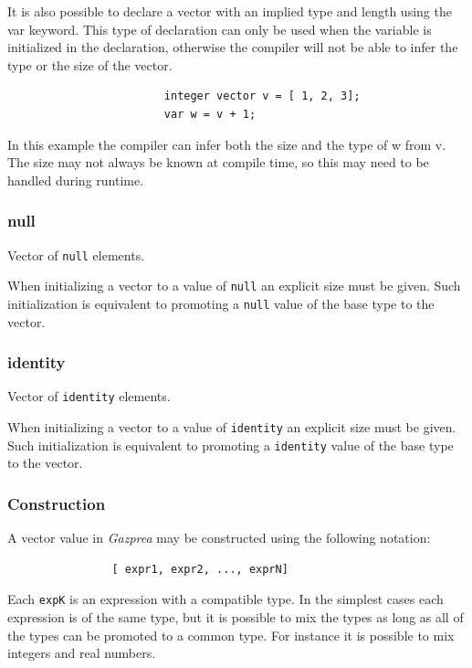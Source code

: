 \documentclass{article}
\begin{document}
\begin{enumerate}
					It is also possible to declare a vector with an implied type and length using the var keyword. This
					type of declaration can only be used when the variable is initialized in the declaration, otherwise
					the compiler will not be able to infer the type or the size of the vector.

					\begin{lstlisting}
						integer vector v = [ 1, 2, 3];
						var w = v + 1;
					\end{lstlisting}
					In this example the compiler can infer both the size and the type of w from v. The size may not
					always be known at compile time, so this may need to be handled during runtime.

			\end{enumerate}

		\subsubsection{null}

			Vector of \texttt{null} elements.

			When initializing a vector to a value of \texttt{null} an explicit size must be given. Such initialization
			is equivalent to promoting a \texttt{null} value of the base type to the vector.

		\subsubsection{identity}

			Vector of \texttt{identity} elements.

			When initializing a vector to a value of \texttt{identity} an explicit size must be given. Such
			initialization is equivalent to promoting a \texttt{identity} value of the base type to the vector.

		\subsubsection{Construction}

			A vector value in \textit{Gazprea} may be constructed using the following notation:

			\begin{lstlisting}
				[ expr1, expr2, ..., exprN]
			\end{lstlisting}

			Each \texttt{expK} is an expression with a compatible type. In the simplest cases each expression is of the
			same type, but it is possible to mix the types as long as all of the types can be promoted to a common type.
			For instance it is possible to mix integers and real numbers.
\end{document}
